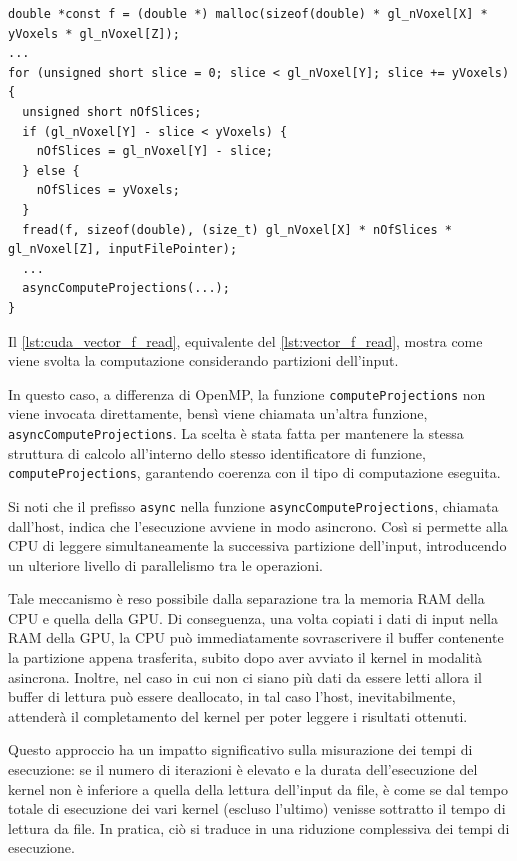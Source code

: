 \documentclass[12pt,a4paper]{report}
\begin{document}
\begin{lstlisting}[language=CStyle, caption={Codice CUDA-C per la lettura di \(f\).}, label={lst:cuda_vector_f_read}]
double *const f = (double *) malloc(sizeof(double) * gl_nVoxel[X] * yVoxels * gl_nVoxel[Z]);
...
for (unsigned short slice = 0; slice < gl_nVoxel[Y]; slice += yVoxels) {
  unsigned short nOfSlices;
  if (gl_nVoxel[Y] - slice < yVoxels) {
    nOfSlices = gl_nVoxel[Y] - slice;
  } else {
    nOfSlices = yVoxels;
  }
  fread(f, sizeof(double), (size_t) gl_nVoxel[X] * nOfSlices * gl_nVoxel[Z], inputFilePointer);
  ...
  asyncComputeProjections(...);
}
\end{lstlisting}

Il \autoref{lst:cuda_vector_f_read}, equivalente del \autoref{lst:vector_f_read}, mostra come viene svolta la computazione
considerando partizioni dell'input.

In questo caso, a differenza di OpenMP, la funzione \lstinline{computeProjections} non viene invocata direttamente, bensì viene
chiamata un'altra funzione, \mbox{\lstinline{asyncComputeProjections}.}
La scelta è stata fatta per mantenere la stessa struttura di calcolo all'interno dello stesso identificatore di funzione,
\lstinline{computeProjections}, garantendo coerenza con il tipo di computazione eseguita.

Si noti che il prefisso \lstinline{async} nella funzione \mbox{\lstinline{asyncComputeProjections},} chiamata dall'host, indica
che l'esecuzione avviene in modo asincrono.
Così si permette alla CPU di leggere simultaneamente la successiva partizione dell'input, introducendo un ulteriore livello di
parallelismo tra le operazioni.

Tale meccanismo è reso possibile dalla separazione tra la memoria RAM della CPU e quella della GPU.
Di conseguenza, una volta copiati i dati di input nella RAM della GPU, la CPU può immediatamente sovrascrivere il buffer
contenente la partizione appena trasferita, subito dopo aver avviato il kernel in modalità asincrona.
Inoltre, nel caso in cui non ci siano più dati da essere letti allora il buffer di lettura può essere deallocato, in tal caso
l'host, inevitabilmente, attenderà il completamento del kernel per poter leggere i risultati ottenuti.

Questo approccio ha un impatto significativo sulla misurazione dei tempi di esecuzione: se il numero di iterazioni è elevato e la
durata dell'esecuzione del kernel non è inferiore a quella della lettura dell'input da file, è come se dal tempo totale di
esecuzione dei vari kernel (escluso l'ultimo) venisse sottratto il tempo di lettura da file.
In pratica, ciò si traduce in una riduzione complessiva dei tempi di esecuzione.
\end{document}
